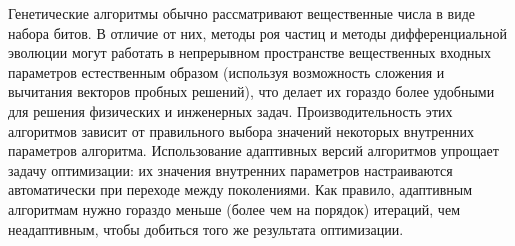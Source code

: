 Генетические алгоритмы обычно рассматривают вещественные числа в виде
набора битов.  В отличие от них, методы роя частиц и методы
дифференциальной эволюции могут работать в непрерывном пространстве
вещественных входных параметров естественным образом (используя
возможность сложения и вычитания векторов пробных решений), что делает
их гораздо более удобными для решения физических и инженерных
задач.  Производительность этих алгоритмов зависит от правильного
выбора значений некоторых внутренних параметров
алгоритма.  Использование адаптивных версий алгоритмов упрощает задачу
оптимизации: их значения внутренних параметров настраиваются
автоматически при переходе между поколениями. Как правило, адаптивным
алгоритмам нужно гораздо меньше (более чем на порядок) итераций, чем
неадаптивным, чтобы добиться того же результата оптимизации.

